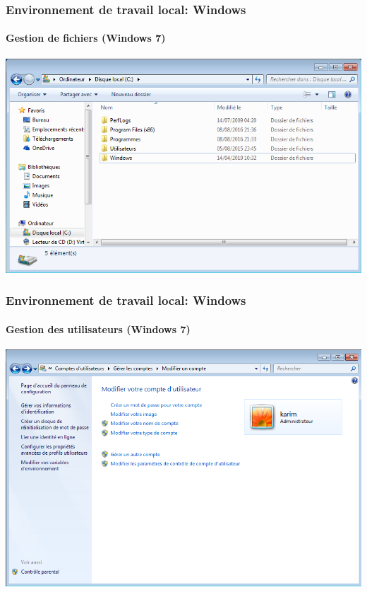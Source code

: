 \documentclass[xcolor=table]{beamer}
\begin{document}
\begin{frame}
\frametitle{Environnement de travail local: Windows}
\framesubtitle{Gestion de fichiers (Windows 7)}

\begin{center}
	\includegraphics[height=
	.8\textheight]{../img/Bweb01-environnement/win7-files.png}
\end{center}

\end{frame}

\begin{frame}
\frametitle{Environnement de travail local: Windows}
\framesubtitle{Gestion des utilisateurs (Windows 7)}

\begin{center}
	\includegraphics[height=
	.8\textheight]{../img/Bweb01-environnement/win7-users.png}
\end{center}

\end{frame}
\end{document}
